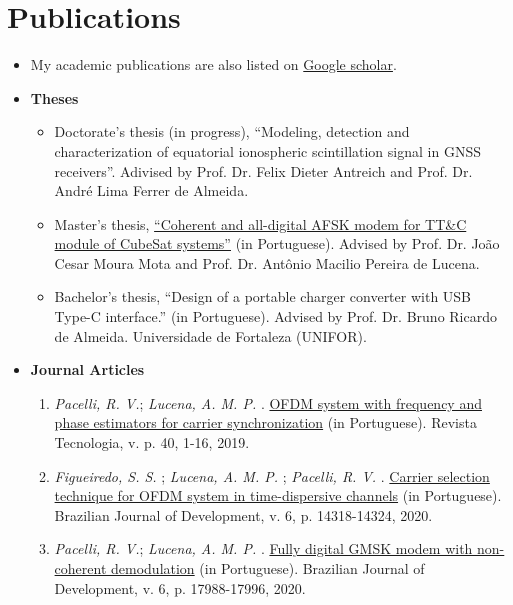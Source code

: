 \section{Publications}

\begin{itemize}[leftmargin=0.15in, label={}] %
    \item My academic publications are also listed on \href{https://scholar.google.com.br/citations?user=Kj6Gzs4AAAAJ&hl=pt-BR&oi=sra}{Google scholar}.
    \item \textbf{Theses}
    \begin{itemize}%
        \item Doctorate's thesis (in progress), ``Modeling, detection and characterization of equatorial ionospheric scintillation signal in GNSS receivers''. Adivised by Prof. Dr. Felix Dieter Antreich and Prof. Dr. André Lima Ferrer de Almeida.
        \item Master's thesis, \href{http://repositorio.ufc.br/bitstream/riufc/60259/1/2021_dis_rvpacelli.pdf}{``Coherent and all-digital AFSK modem for TT\&C module of CubeSat systems''} (in Portuguese). Advised by Prof. Dr. João Cesar Moura Mota and Prof. Dr. Antônio Macilio Pereira de Lucena.
        \item Bachelor's thesis, ``Design of a portable charger converter with USB Type-C interface.'' (in Portuguese). Advised by Prof. Dr. Bruno Ricardo de Almeida. Universidade de Fortaleza (UNIFOR).
    \end{itemize}
    \item \textbf{Journal Articles}
    \begin{enumerate}[label=\textbf{J\arabic*.}, align=left, leftmargin=1.5cm]
        \item \textit{Pacelli, R. V.}; \textit{Lucena, A. M. P.} . \href{https://periodicos.unifor.br/tec/article/view/7506/5991}{OFDM system with frequency and phase estimators for carrier synchronization} (in Portuguese). Revista Tecnologia, v. p. 40, 1-16, 2019.
        \item \textit{Figueiredo, S. S.} ; \textit{Lucena, A. M. P.} ; \textit{Pacelli, R. V.} . \href{https://www.brazilianjournals.com/index.php/BRJD/article/view/7946/6889}{Carrier selection technique for OFDM system in time-dispersive channels} (in Portuguese). Brazilian Journal of Development, v. 6, p. 14318-14324, 2020.
        \item \textit{Pacelli, R. V.}; \textit{Lucena, A. M. P.} . \href{https://www.brazilianjournals.com/index.php/BRJD/article/view/8538/7345}{Fully digital GMSK modem with non-coherent demodulation} (in Portuguese). Brazilian Journal of Development, v. 6, p. 17988-17996, 2020.

\end{enumerate}
\end{itemize}
